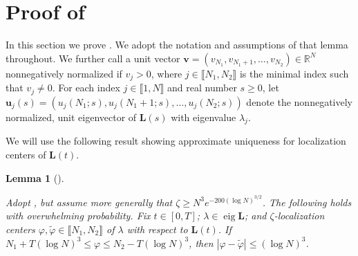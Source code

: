 \documentclass{amsart}
\numberwithin{equation}{section}
\DeclareMathOperator{\eig}{eig}
\newtheorem{lem}[thm]{Lemma}
\theoremstyle{remark}
\theoremstyle{definition}
\begin{document}
	
	
	\section{Proof of } 
	
	\label{Proofst} 
	
	In this section we prove . We adopt the notation and assumptions of that lemma throughout. We further call a unit vector $\bm{v} = (v_{N_1}, v_{N_1+1}, \ldots , v_{N_2}) \in \mathbb{R}^N$ nonnegatively normalized if $v_j > 0$, where $j \in \llbracket N_1, N_2 \rrbracket$ is the minimal index such that $v_j \ne 0$. For each index $j \in \llbracket 1, N \rrbracket$ and real number $s \ge 0$, let $\bm{u}_j (s) = (u_j (N_1;s), u_j (N_1+1;s), \ldots , u_j (N_2; s))$ denote the nonnegatively normalized, unit eigenvector of $\bm{L}(s)$ with eigenvalue $\lambda_j$. 
	
	We will use the following result showing approximate uniqueness for localization centers of $\bm{L}(t)$.
	
	
	\begin{lem}[{\cite[Proposition 2.9]{LC}}]
		\label{centerdistance2} 
		
		Adopt , but assume more generally that $\zeta \ge N^3 e^{-200 (\log N)^{3/2}}$. The following holds with overwhelming probability. Fix $t \in [0, T]$; $\lambda \in \eig \bm{L}$; and $\zeta$-localization centers $\varphi, \tilde{\varphi} \in \llbracket N_1, N_2 \rrbracket$ of $\lambda$ with respect to $\bm{L}(t)$. If $N_1 + T (\log N)^3 \le \varphi \le N_2 - T (\log N)^3$, then $|\varphi - \tilde{\varphi}| \le (\log N)^3$. 
		
	\end{lem} 
	
	
	
	
	
\end{document}
